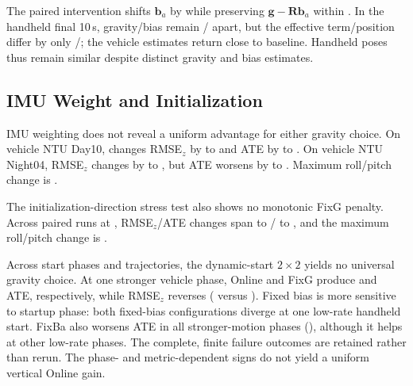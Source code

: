 The paired intervention shifts $\mathbf b_a$ by \CoupledStateInitialBA{} while
preserving $\mathbf g-\mathbf R\mathbf b_a$ within
\CoupledStateInitialHMax{}. In the handheld final 10\,s, gravity/bias remain
\CoupledHhsGRange{}/\CoupledHhsBARange{} apart, but the effective term/position
differ by only \CoupledHhsHRange{}/\CoupledHhsPoseRange{}; the vehicle estimates
return close to baseline. Handheld poses thus remain similar despite distinct
gravity and bias estimates.

\subsection{IMU Weight and Initialization}
IMU weighting does not reveal a uniform advantage for either gravity choice.
On vehicle NTU Day10, \methodG{} changes RMSE$_z$ by
\ImuDayZMin{} to \ImuDayZMax{} and ATE by \ImuDayATEMin{} to
\ImuDayATEMax{}. On vehicle NTU Night04, RMSE$_z$ changes by
\ImuNightZMin{} to \ImuNightZMax{}, but ATE worsens by
\ImuNightATEMin{} to \ImuNightATEMax{}. Maximum roll/pitch change is
\ImuStressAttMax{}.

The initialization-direction stress test also shows no monotonic FixG penalty.
Across \NumInitStressRuns{} paired runs at \InitStressAngles{}, RMSE$_z$/ATE
changes span \InitErrZMin{} to \InitErrZMax{}/\InitErrATEMin{} to
\InitErrATEMax{}, and the maximum roll/pitch change is \InitErrAttMax{}.

Across \NumDynamicFactorialPhases{} start phases and
\NumDynamicFactorialRuns{} trajectories, the dynamic-start $2\times2$ yields
no universal gravity choice. At one
stronger vehicle phase, Online and FixG produce
\FastDynamicRescueOnlineATE{} and \FastDynamicRescueFixGATE{} ATE,
respectively, while RMSE$_z$ reverses
(\FastDynamicRescueOnlineZ{} versus \FastDynamicRescueFixGZ{}). Fixed bias is
more sensitive to startup phase: both fixed-bias configurations diverge at one
low-rate handheld start. FixBa also worsens ATE in all
\NumStrongFixBaATEWorse{} stronger-motion phases (\StrongFixBaATERange{}),
although it helps at other low-rate phases. The
\NumDynamicFixedBaFailureOutcomes{} complete, finite failure outcomes are
retained rather than rerun. The phase- and metric-dependent signs do not yield
a uniform vertical Online gain.
